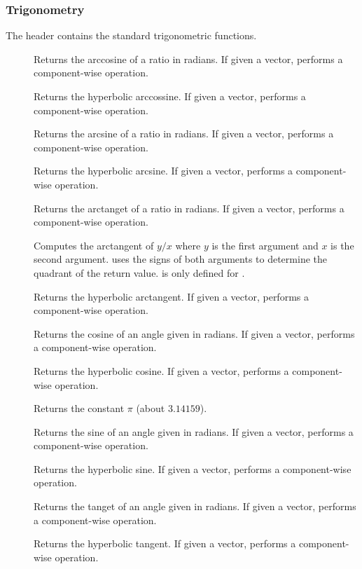 \subsubsection{Trigonometry}

The  header contains the standard trigonometric
functions.

\begin{description}
\item[]   Returns the
  arccosine of a ratio in radians. If given a vector, performs a
  component-wise operation.
\item[]  
  Returns the hyperbolic arccossine. If given a vector, performs a
  component-wise operation.
\item[]   Returns the
  arcsine of a ratio in radians. If given a vector, performs a
  component-wise operation.
\item[]  
  Returns the hyperbolic arcsine. If given a vector, performs a
  component-wise operation.
\item[]   Returns the
  arctanget of a ratio in radians. If given a vector, performs a
  component-wise operation.
\item[] Computes the arctangent of $y/x$ where $y$ is the
  first argument and $x$ is the second argument. 
  uses the signs of both arguments to determine the quadrant of the return
  value.  is only defined for .
\item[]  
  Returns the hyperbolic arctangent. If given a vector, performs a
  component-wise operation.
\item[]  Returns the cosine of an angle given in
  radians. If given a vector, performs a component-wise operation.
\item[]  Returns the hyperbolic
  cosine. If given a vector, performs a component-wise operation.
\item[] \index{$\pi$} Returns the constant $\pi$ (about
  $3.14159$).
\item[]  Returns the sine of an angle given in
  radians. If given a vector, performs a component-wise operation.
\item[]  Returns the hyperbolic
  sine. If given a vector, performs a component-wise operation.
\item[]  Returns the tanget of an angle given
  in radians. If given a vector, performs a component-wise operation.
\item[]  Returns the hyperbolic
  tangent. If given a vector, performs a component-wise operation.
\end{description}

